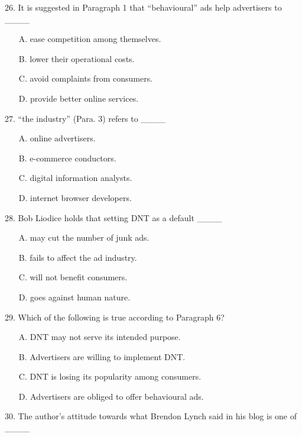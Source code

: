 \documentclass[UTF8,11pt]{ctexart}
\begin{document}
26. It is suggested in Paragraph 1 that “behavioural” ads help advertisers to \_\_\_\_


\begin{itemize}[leftmargin=2em,itemsep=.2em,topsep=.4em]\item[A.] ease competition among themselves.
\item[B.] lower their operational costs.
\item[C.] avoid complaints from consumers.
\item[D.] provide better online services.
\end{itemize}

27. “the industry” (Para. 3) refers to \_\_\_\_


\begin{itemize}[leftmargin=2em,itemsep=.2em,topsep=.4em]\item[A.] online advertisers.
\item[B.] e-commerce conductors.
\item[C.] digital information analysts.
\item[D.] internet browser developers.
\end{itemize}

28. Bob Liodice holds that setting DNT as a default \_\_\_\_


\begin{itemize}[leftmargin=2em,itemsep=.2em,topsep=.4em]\item[A.] may cut the number of junk ads.
\item[B.] fails to affect the ad industry.
\item[C.] will not benefit consumers.
\item[D.] goes against human nature.
\end{itemize}

29. Which of the following is true according to Paragraph 6?


\begin{itemize}[leftmargin=2em,itemsep=.2em,topsep=.4em]\item[A.] DNT may not serve its intended purpose.
\item[B.] Advertisers are willing to implement DNT.
\item[C.] DNT is losing its popularity among consumers.
\item[D.] Advertisers are obliged to offer behavioural ads.
\end{itemize}

30. The author’s attitude towards what Brendon Lynch said in his blog is one of \_\_\_\_
\end{document}

